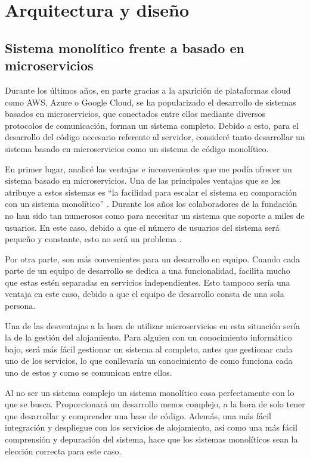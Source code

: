 \section{Arquitectura y diseño}

\subsection{Sistema monolítico frente a basado en microservicios}

Durante los últimos años, en parte gracias a la aparición de plataformas cloud como AWS, Azure o Google Cloud, se ha popularizado el desarrollo de sistemas basados en microservicios, que conectados entre ellos mediante diversos protocolos de comunicación, forman un sistema completo. Debido a esto, para el desarrollo del código necesario referente al servidor, consideré tanto desarrollar un sistema basado en microservicios como un sistema de código monolítico.

En primer lugar, analicé las ventajas e inconvenientes que me podía ofrecer un sistema basado en microservicios. Una de las principales ventajas que se les atribuye a estos sistemas es ``la facilidad para escalar el sistema en comparación con un sistema monolítico'' \cite{arquitectura-comp1}. Durante los años los colaboradores de la fundación no han sido tan numerosos como para necesitar un sistema que soporte a miles de usuarios. En este caso, debido a que el número de usuarios del sistema será pequeño y constante, esto no será un problema \cite[p.~4]{monolith1}.

Por otra parte, son más convenientes para un desarrollo en equipo. Cuando cada parte de un equipo de desarrollo se dedica a una funcionalidad, facilita mucho que estas estén separadas en servicios independientes. Esto tampoco sería una ventaja en este caso, debido a que el equipo de desarrollo consta de una sola persona. 

Una de las desventajas a la hora de utilizar microservicios en esta situación sería la de la gestión del alojamiento. Para alguien con un conocimiento informático bajo, será más fácil gestionar un sistema al completo, antes que gestionar cada uno de los servicios, lo que conllevaría un conocimiento de como funciona cada uno de estos y como se comunican entre ellos.

Al no ser un sistema complejo un sistema monolítico casa perfectamente con lo que se busca. Proporcionará un desarrollo menos complejo, a la hora de solo tener que desarrollar y comprender una base de código. Además, una más fácil integración y despliegue con los servicios de alojamiento, así como una más fácil comprensión y depuración del sistema, hace que los sistemas monolíticos sean la elección correcta para este caso.

